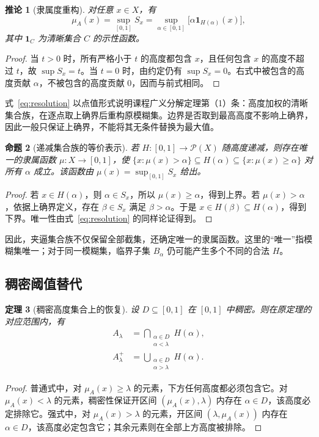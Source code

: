 \documentclass[UTF8,fontset=fandol,zihao=-4,a4paper]{ctexart}
\numberwithin{equation}{section}
\theoremstyle{reportplain}
\newtheorem{theorem}{定理}[section]
\newtheorem{proposition}[theorem]{命题}
\newtheorem{corollary}[theorem]{推论}
\newcommand{\Pow}{\mathcal P}
\newcommand{\muA}{\mu_A}
\newcommand{\ind}{\mathbf 1}
\newcommand{\cut}[1]{A_{#1}}
\newcommand{\scut}[1]{A_{#1}^{+}}
\newcommand{\set}[1]{\{#1\}}
\newcommand{\eqtag}[1]{\label{#1}}
\begin{document}
\begin{corollary}[隶属度重构]
对任意 $x\in X$，有
\begin{equation}
\muA(x)=\sup_{[0,1]}S_x
=\sup_{\alpha\in[0,1]}\bigl[\alpha\ind_{H(\alpha)}(x)\bigr],
\eqtag{eq:resolution}
\end{equation}
其中 $\ind_C$ 为清晰集合 $C$ 的示性函数。
\end{corollary}
\begin{proof}
当 $t>0$ 时，所有严格小于 $t$ 的高度都包含 $x$，且任何包含 $x$ 的高度不超过 $t$，故 $\sup S_x=t$。当 $t=0$ 时，由约定仍有 $\sup S_x=0$。右式中被包含的高度贡献 $\alpha$，不被包含的高度贡献 0，因而与前式相同。\end{proof}

式~\eqref{eq:resolution} 以点值形式说明课程广义分解定理第（1）条：高度加权的清晰集合族，在逐点取上确界后重构原模糊集。边界是否取到最高高度不影响上确界，因此一般只保证上确界，不能将其无条件替换为最大值。

\begin{proposition}[递减集合族的等价表示]
若 $H:[0,1]\to\Pow(X)$ 随高度递减，则存在唯一的隶属函数 $\mu:X\to[0,1]$，使 $\set{x:\mu(x)>\alpha}\subseteq H(\alpha)\subseteq\set{x:\mu(x)\ge\alpha}$ 对所有 $\alpha$ 成立。该函数由 $\mu(x)=\sup_{[0,1]}S_x$ 给出。
\end{proposition}
\begin{proof}
若 $x\in H(\alpha)$，则 $\alpha\in S_x$，所以 $\mu(x)\ge\alpha$，得到上界。若 $\mu(x)>\alpha$，依据上确界定义，存在 $\beta\in S_x$ 满足 $\beta>\alpha$。于是 $x\in H(\beta)\subseteq H(\alpha)$，得到下界。唯一性由式~\eqref{eq:resolution} 的同样论证得到。\end{proof}

因此，夹逼集合族不仅保留全部截集，还确定唯一的隶属函数。这里的“唯一”指模糊集唯一；对于同一模糊集，临界子集 $B_\alpha$ 仍可能产生多个不同的合法 $H$。

\subsection{稠密阈值替代}
\begin{theorem}[稠密高度集合上的恢复]
设 $D\subseteq[0,1]$ 在 $[0,1]$ 中稠密。则在原定理的对应范围内，有
\begin{align}
\cut{\lambda}&=\bigcap_{\substack{\alpha\in D\\\alpha<\lambda}}H(\alpha),\eqtag{eq:dense-left}\\
\scut{\lambda}&=\bigcup_{\substack{\alpha\in D\\\alpha>\lambda}}H(\alpha).\eqtag{eq:dense-right}
\end{align}
\end{theorem}
\begin{proof}
普通式中，对 $\muA(x)\ge\lambda$ 的元素，下方任何高度都必须包含它。对 $\muA(x)<\lambda$ 的元素，稠密性保证开区间 $(\muA(x),\lambda)$ 内存在 $\alpha\in D$，该高度必定排除它。强式中，对 $\muA(x)>\lambda$ 的元素，开区间 $(\lambda,\muA(x))$ 内存在 $\alpha\in D$，该高度必定包含它；其余元素则在全部上方高度被排除。\end{proof}
\end{document}
